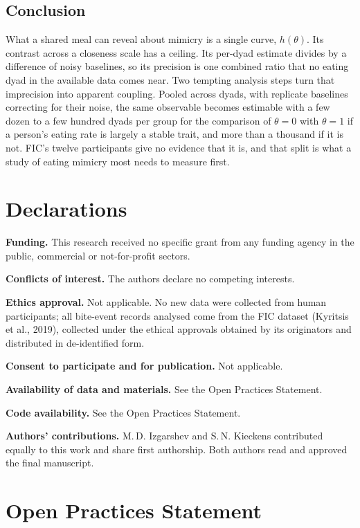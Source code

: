 \documentclass[12pt]{article}
\begin{document}
\subsection*{Conclusion}

What a shared meal can reveal about mimicry is a single curve, $h(\theta)$. Its
contrast across a closeness scale has a ceiling. Its per-dyad estimate divides by
a difference of noisy baselines, so its precision is one combined ratio that no
eating dyad in the available data comes near. Two tempting analysis steps turn
that imprecision into apparent coupling. Pooled across dyads, with replicate
baselines correcting for their noise, the same observable becomes estimable with
a few dozen to a few hundred dyads per group for the comparison of $\theta=0$ with
$\theta=1$ if a person's eating rate is largely a stable trait, and more than a
thousand if it is not. FIC's twelve participants give no evidence that it is, and
that split is what a study of eating mimicry most needs to measure first.

\section*{Declarations}

\noindent\textbf{Funding.} This research received no specific grant from any
funding agency in the public, commercial or not-for-profit sectors.

\noindent\textbf{Conflicts of interest.} The authors declare no competing interests.

\noindent\textbf{Ethics approval.} Not applicable. No new data were collected from
human participants; all bite-event records analysed come from the FIC dataset
(Kyritsis et al., 2019), collected under the ethical approvals obtained by its
originators and distributed in de-identified form.

\noindent\textbf{Consent to participate and for publication.} Not applicable.

\noindent\textbf{Availability of data and materials.} See the Open Practices
Statement.

\noindent\textbf{Code availability.} See the Open Practices Statement.

\noindent\textbf{Authors' contributions.} M.\,D. Izgarshev and S.\,N. Kieckens
contributed equally to this work and share first authorship. Both authors read and
approved the final manuscript.

\section*{Open Practices Statement}
\end{document}
